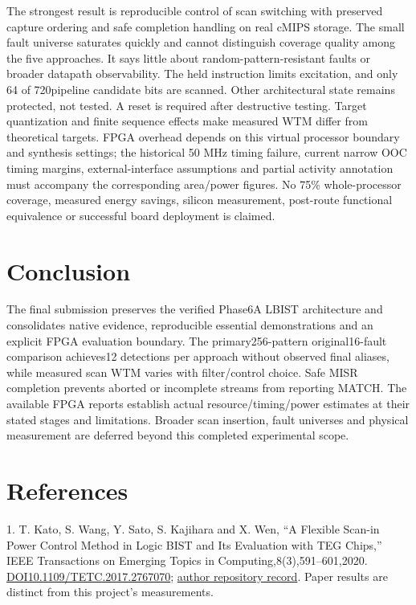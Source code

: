\documentclass[11pt,a4paper]{article}
\begin{document}
The strongest result is reproducible control of scan switching with preserved capture ordering and safe completion handling on real cMIPS storage. The small fault universe saturates quickly and cannot distinguish coverage quality among the five approaches. It says little about random-pattern-resistant faults or broader datapath observability. The held instruction limits excitation, and only 64 of 720pipeline candidate bits are scanned. Other architectural state remains protected, not tested. A reset is required after destructive testing. Target quantization and finite sequence effects make measured WTM differ from theoretical targets. FPGA overhead depends on this virtual processor boundary and synthesis settings; the historical 50 MHz timing failure, current narrow OOC timing margins, external-interface assumptions and partial activity annotation must accompany the corresponding area/power figures. No 75\% whole-processor coverage, measured energy savings, silicon measurement, post-route functional equivalence or successful board deployment is claimed.



\section{Conclusion}


The final submission preserves the verified Phase6A LBIST architecture and consolidates native evidence, reproducible essential demonstrations and an explicit FPGA evaluation boundary. The primary256-pattern original16-fault comparison achieves12 detections per approach without observed final aliases, while measured scan WTM varies with filter/control choice. Safe MISR completion prevents aborted or incomplete streams from reporting MATCH. The available FPGA reports establish actual resource/timing/power estimates at their stated stages and limitations. Broader scan insertion, fault universes and physical measurement are deferred beyond this completed experimental scope.



\section{References}


1. T. Kato, S. Wang, Y. Sato, S. Kajihara and X. Wen, ``A Flexible Scan-in Power Control Method in Logic BIST and Its Evaluation with TEG Chips,'' IEEE Transactions on Emerging Topics in Computing,8(3),591--601,2020. \href{https://doi.org/10.1109/TETC.2017.2767070}{DOI10.1109/TETC.2017.2767070}; \href{https://kyutech.repo.nii.ac.jp/records/6935}{author repository record}. Paper results are distinct from this project's measurements.
\end{document}
